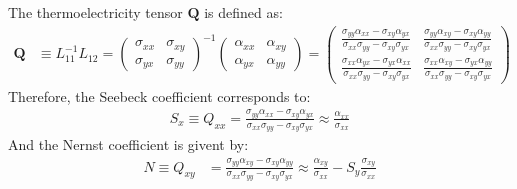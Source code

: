 \documentclass[notitlepage,11pt,nofootinbib]{revtex4-1}
\begin{document}
The thermoelectricity tensor $\boldsymbol{Q}$ is defined as:
\begin{align}
\boldsymbol{Q} &\equiv L_{11}^{-1}L_{12}
=
\begin{pmatrix}
\sigma_{xx} & \sigma_{xy}\\
\sigma_{yx} & \sigma_{yy}
\end{pmatrix}^{-1}
\begin{pmatrix}
\alpha_{xx} & \alpha_{xy}\\
\alpha_{yx} & \alpha_{yy}
\end{pmatrix}
=
\begin{pmatrix}
  \frac{\sigma_{yy}\alpha_{xx}-\sigma_{xy}\alpha_{yx}}
  {\sigma_{xx}\sigma_{yy}-\sigma_{xy}\sigma_{yx}} 
& \frac{\sigma_{yy}\alpha_{xy}-\sigma_{xy}\alpha_{yy}}
  {\sigma_{xx}\sigma_{yy}-\sigma_{xy}\sigma_{yx}}\\
  \frac{\sigma_{xx}\alpha_{yx}-\sigma_{yx}\alpha_{xx}}
  {\sigma_{xx}\sigma_{yy}-\sigma_{xy}\sigma_{yx}}
& \frac{\sigma_{xx}\alpha_{xy}-\sigma_{yx}\alpha_{yy}}
  {\sigma_{xx}\sigma_{yy}-\sigma_{xy}\sigma_{yx}}
\end{pmatrix}
\end{align}
Therefore, the Seebeck coefficient corresponds to:
\begin{align}
S_x
\equiv 
Q_{xx} 
=
\frac{\sigma_{yy}\alpha_{xx}-\sigma_{xy}\alpha_{yx}}{\sigma_{xx}\sigma_{yy}-\sigma_{xy}\sigma_{yx}} 
\approx 
\boxed{
\frac{\alpha_{xx}}{\sigma_{xx}}
}
\label{eq_seebeck}
\end{align}
And the Nernst coefficient is givent by:
\begin{align}
N 
\equiv
Q_{xy}
&= 
\frac{\sigma_{yy}\alpha_{xy}-\sigma_{xy}\alpha_{yy}}
{\sigma_{xx}\sigma_{yy}-\sigma_{xy}\sigma_{yx}}
\approx 
\boxed{
\frac{\alpha_{xy}}{\sigma_{xx}}
- S_{y}\frac{\sigma_{xy}}{\sigma_{xx}}
}
\end{align}
\end{document}
